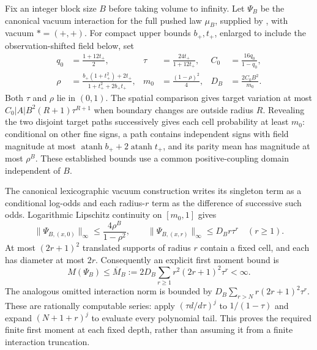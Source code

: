 Fix an integer block size $B$ before taking volume to infinity. Let
$\Psi_B$ be the canonical vacuum interaction for the full pushed law
$\mu_B$, supplied by , with
vacuum $*= (+,+)$. For compact upper bounds $b_+,t_+$, enlarged to include
the observation-shifted field below, set
\begin{align}
 q_0&=\frac{1+12t_+}{2},&
 \tau&=\frac{24t_+}{1+12t_+},& C_0&=\frac{16q_0}{1-q_0},
 \label{eq:rg-pressure-locality-constants}\\
 \rho&=\frac{b_+(1+t_+^2)+2t_+}{1+t_+^2+2b_+t_+},&
 m_0&=\frac{(1-\rho)^2}{4},&D_B&=\frac{2C_0B^2}{m_0}.
 \label{eq:rg-pressure-positive-constants}
\end{align}
Both $\tau$ and $\rho$ lie in $(0,1)$. The spatial comparison gives target
variation at most $C_0|A|B^2(R+1)\tau^{R+1}$ when boundary changes are
outside radius $R$. Revealing the two disjoint target paths successively
gives each cell probability at least $m_0$: conditional on other fine
signs, a path contains independent signs with field magnitude at most
$\operatorname{atanh}b_++2\operatorname{atanh}t_+$, and its parity mean
has magnitude at most $\rho^B$. These established bounds use a common
positive-coupling domain independent of $B$. 

The canonical lexicographic vacuum construction writes its singleton term
as a conditional log-odds and each radius-$r$ term as the difference of
successive such odds. Logarithmic Lipschitz continuity on $[m_0,1]$ gives
\begin{equation}
 \|\Psi_{B,(x,0)}\|_\infty\leq\frac{4\rho^B}{1-\rho^2},\qquad
 \|\Psi_{B,(x,r)}\|_\infty\leq D_Br\tau^r\quad(r\geq1).
 \label{eq:rg-pressure-shell}
\end{equation}
At most $(2r+1)^2$ translated supports of radius $r$ contain a fixed cell,
and each has diameter at most $2r$. Consequently an explicit first moment
bound is
\begin{equation}
 M(\Psi_B)\leq\overline M_B
 :=2D_B\sum_{r\geq1}r^2(2r+1)^2\tau^r<\infty.
 \label{eq:rg-pressure-coarse-moment}
\end{equation}
The analogous omitted interaction norm is bounded by
$D_B\sum_{r>N}r(2r+1)^2\tau^r$. These are rationally computable series:
apply $(\tau d/d\tau)^j$ to $1/(1-\tau)$ and expand
$(N+1+r)^j$ to evaluate every polynomial tail. This proves the required
finite first moment at each fixed depth, rather than assuming it from a
finite interaction truncation. 

